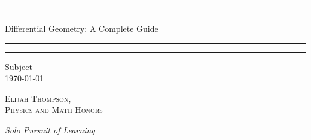 \documentclass[12pt, a4paper, oneside, openright, titlepage]{book}
\begin{document}

\begin{titlepage}
    \centering
    \scshape
    \vspace*{\baselineskip}
    \rule{\textwidth}{1.6pt}\vspace*{-\baselineskip}\vspace*{2pt}
    \rule{\textwidth}{0.4pt}
    
    \vspace{0.75\baselineskip}
    
    {\LARGE Differential Geometry: A Complete Guide}
    
    \vspace{0.75\baselineskip}
    
    \rule{\textwidth}{0.4pt}\vspace*{-\baselineskip}\vspace{3.2pt}
    \rule{\textwidth}{1.6pt}
    
    \vspace{2\baselineskip}
    Subject \\
    \vspace*{3\baselineskip}
    \monthdayyeardate\today \\
    \vspace*{5.0\baselineskip}
    
    {\scshape\Large Elijah Thompson, \\ Physics and Math Honors\\}
    
    \vspace{1.0\baselineskip}
    \textit{Solo Pursuit of Learning}
    \vfill
    \enlargethispage{1in}
    \begin{figure}[b!]
    \end{figure}
\end{titlepage}
\end{document}
